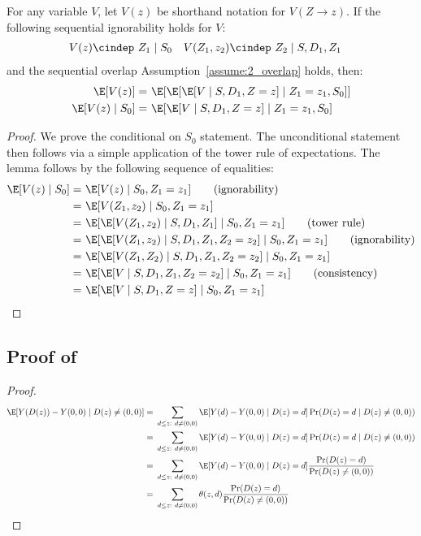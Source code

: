 \begin{lemma}\label{lem:g-formula} For any variable $V$, let $V(z)$ be shorthand notation for $V(Z\to z)$. If the following sequential ignorability holds for $V$:
\begin{align*}
    V(z) \cindep~& Z_1 \mid S_0 & 
    V(Z_1, z_2) \cindep~& Z_2 \mid S, D_1, Z_1
\end{align*}
and the sequential overlap Assumption~\ref{assume:2_overlap} holds, then:
\begin{align}
    \E[V(z)] =~& \E[\E[\E[V\mid S, D_1, Z=z]\mid Z_1=z_1, S_0]]\\
    \E[V(z)\mid S_0] =~& \E[\E[V\mid S, D_1, Z=z]\mid Z_1=z_1, S_0]
\end{align}
\end{lemma}
\begin{proof}
We prove the conditional on $S_0$ statement. The unconditional statement then follows via a simple application of the tower rule of expectations. The lemma follows by the following sequence of equalities:
    \begin{align*}
        \E[V(z)\mid S_0]
        =~& \E[V(z)\mid S_0, Z_1=z_1] \tag{ignorability}\\
        =~& \E[V(Z_1, z_2)\mid S_0, Z_1=z_1] \\
        =~& \E[\E[V(Z_1, z_2)\mid S, D_1, Z_1]\mid S_0, Z_1=z_1] \tag{tower rule}\\
        =~& \E[\E[V(Z_1, z_2)\mid S, D_1, Z_1, Z_2=z_2]\mid S_0, Z_1=z_1] \tag{ignorability}\\
        =~& \E[\E[V(Z_1, Z_2)\mid S, D_1, Z_1, Z_2=z_2]\mid S_0, Z_1=z_1]\\
        =~& \E[\E[V\mid S, D_1, Z_1, Z_2=z_2]\mid S_0, Z_1=z_1] \tag{consistency}\\
        =~& \E[\E[V\mid S, D_1, Z=z]\mid S_0, Z_1=z_1]
    \end{align*}
\end{proof}

\subsection{Proof of }
\begin{proof}
    \begin{align*}
        \E[Y(D(z)) - Y(0,0) \mid D(z) \neq (0,0)] =~& \sum_{d \leq z:~d\neq (0,0)} \E[Y(d) - Y(0,0) \mid D(z)=d] \Pr(D(z)=d\mid D(z)\neq (0,0))\\
        =~& \sum_{d \leq z:~d\neq (0,0)} \E[Y(d) - Y(0,0) \mid D(z)=d] \Pr(D(z)=d\mid D(z)\neq (0,0))\\
        =~& \sum_{d \leq z:~d\neq (0,0)} \E[Y(d) - Y(0,0) \mid D(z)=d] \frac{\Pr(D(z)=d)}{\Pr(D(z)\neq (0,0))}\\
        =~& \sum_{d \leq z:~d\neq (0,0)} \theta(z,d) \frac{\Pr(D(z)=d)}{\Pr(D(z)\neq (0,0))}
    \end{align*}
\end{proof}

